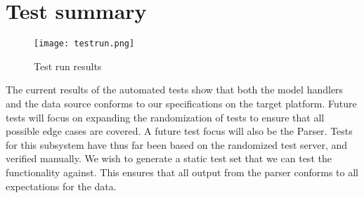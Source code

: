 \section{Test summary} %
\label{sec:Test_summary}

\begin{figure}[h!]
    \centerline{\texttt{[image: testrun.png]}}
    \caption{Test run results}
    \label{fig:test_results}
\end{figure}

The current results of the automated tests show that both the model handlers and the data source
conforms to our specifications on the target platform. Future tests will focus on expanding the
randomization of tests to ensure that all possible edge cases are covered. A future test focus will
also be the Parser. Tests for this subsystem have thus far been based on the randomized test server,
and verified manually. We wish to generate a static test set that we can test the functionality against.
This ensures that all output from the parser conforms to all expectations for the data.


